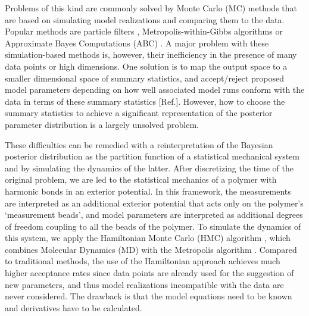 \documentclass[11pt]{article}
\theoremstyle{definition}
\begin{document}
Problems of this kind are commonly solved by Monte Carlo (MC) methods that are based on simulating model realizations and comparing them to the data. Popular methods are particle filters \cite{chopin_2013_SMC2}, Metropolis-within-Gibbs algorithms \cite{tomassini_2009_smoothing, reichert_2009_timedepParameters} or Approximate Bayes Computations (ABC) \cite{marin_2012_ABC, Albert_2014_ABC}. 
A major problem with these simulation-based methods is, however, their inefficiency in the presence of many data points or high dimensions. One solution is to map the output space to a smaller dimensional space of summary statistics, and accept/reject proposed model parameters depending on how well associated model runs conform with the data in terms of these summary statistics [Ref.]. However, how to choose the summary statistics to achieve a significant representation of the posterior parameter distribution is a largely unsolved problem. 

These difficulties can be remedied with a reinterpretation of the Bayesian posterior distribution as the partition function of a statistical mechanical system and by simulating the dynamics of the latter.
After discretizing the time of the original problem, we are led to the statistical mechanics of a polymer %
with harmonic bonds in an exterior potential. In this framework, the measurements are interpreted as an additional exterior potential that acts only on the polymer's `measurement beads', and model parameters are interpreted as additional degrees of freedom coupling to all the beads of the polymer. 
To simulate the dynamics of this system, we apply the Hamiltonian Monte Carlo (HMC) algorithm \cite{duane_1987}, which combines Molecular Dynamics (MD) \cite{alder_1959_MD, rahman_1964_MD} with the Metropolis algorithm  \cite{metropolis_1953}. 
Compared to traditional methods, the use of the Hamiltonian approach achieves much higher acceptance rates since data points are already used for the suggestion of new parameters, and thus model realizations incompatible with the data are never considered. The drawback is that the model equations need to be known and derivatives have to be calculated.
\end{document}

